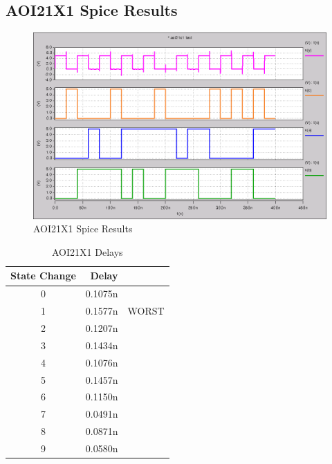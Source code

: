     \newpage
    \subsection{AOI21X1 Spice Results}
        
        \begin{figure}[H]
            \centering
            \includegraphics[width=0.75\linewidth]{../../spice/aoi21x1.png}
            \caption{AOI21X1 Spice Results}
        \end{figure}
        \begin{table}[H]
            \centering
            \begin{tabular}{crc}
                \toprule
                \textbf{State Change} & \textbf{Delay} & \\
                \midrule
                0 & 0.1075n & \\
                1 & 0.1577n & WORST \\
                2 & 0.1207n & \\
                3 & 0.1434n & \\
                4 & 0.1076n & \\
                5 & 0.1457n & \\
                6 & 0.1150n & \\
                7 & 0.0491n & \\
                8 & 0.0871n & \\
                9 & 0.0580n & \\
                \bottomrule
            \end{tabular}
            \caption{AOI21X1 Delays}
        \end{table}

    \newpage
